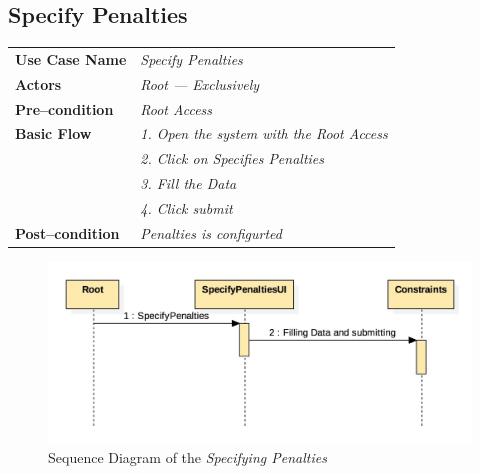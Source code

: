 \documentclass{article}
\begin{document}
\subsection{Specify Penalties}
    \begin{tabular}{ l | l }
    \toprule
      \rowcolor{LightCyan}
      \textbf{Use Case Name}    & \textit{Specify Penalties}\\
      \textbf{Actors}           & \textit{Root --- Exclusively}\\
      \rowcolor{LightCyan}
      \textbf{Pre--condition}   & \textit{Root Access}\\
      \textbf{Basic Flow}       & \textit{1. Open the system with the Root Access}\\
                                & \textit{2. Click on Specifies Penalties}\\
                                & \textit{3. Fill the Data}\\
                                & \textit{4. Click submit}\\
      \rowcolor{LightCyan}
      \textbf{Post--condition}  & \textit{Penalties is configurted}\\
    \toprule
    \end{tabular}
\begin{figure}[ht!]
\centering
\includegraphics[width=128mm]{Sequence_SpecifyPenalties}
\caption{Sequence Diagram of the \textit{Specifying Penalties}}
\end{figure}
\end{document}
